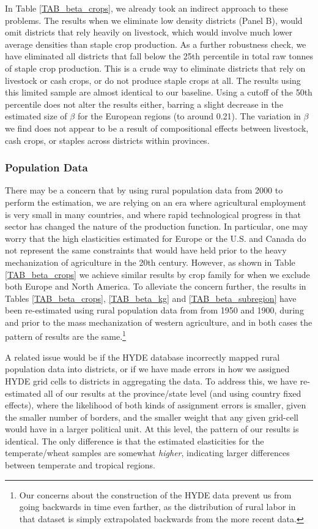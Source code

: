 \documentclass[11pt]{article}
\begin{document}
In Table \ref{TAB_beta_crops}, we already took an indirect approach to these problems. The results when we eliminate low density districts (Panel B), would omit districts that rely heavily on livestock, which would involve much lower average densities than staple crop production. As a further robustness check, we have eliminated all districts that fall below the 25th percentile in total raw tonnes of staple crop production. This is a crude way to eliminate districts that rely on livestock or cash crops, or do not produce staple crops at all. The results using this limited sample are almost identical to our baseline. Using a cutoff of the 50th percentile does not alter the results either, barring a slight decrease in the estimated size of $\beta$ for the European regions (to around 0.21). The variation in $\beta$ we find does not appear to be a result of compositional effects between livestock, cash crops, or staples across districts within provinces.

\subsubsection{Population Data} 
There may be a concern that by using rural population data from 2000 to perform the estimation, we are relying on an era where agricultural employment is very small in many countries, and where rapid technological progress in that sector has changed the nature of the production function. In particular, one may worry that the high elasticities estimated for Europe or the U.S. and Canada do not represent the same constraints that would have held prior to the heavy mechanization of agriculture in the 20th century. However, as shown in Table \ref{TAB_beta_crops} we achieve similar results by crop family for when we exclude both Europe and North America. To alleviate the concern further, the results in Tables \ref{TAB_beta_crops}, \ref{TAB_beta_kg} and \ref{TAB_beta_subregion} have been re-estimated using rural population data from \citet{hyde31} from 1950 and 1900, during and prior to the mass mechanization of western agriculture, and in both cases the pattern of results are the same.\footnote{Our concerns about the construction of the HYDE data prevent us from going backwards in time even farther, as the distribution of rural labor in that dataset is simply extrapolated backwards from the more recent data.}

A related issue would be if the HYDE database incorrectly mapped rural population data into districts, or if we have made errors in how we assigned HYDE grid cells to districts in aggregating the data. To address this, we have re-estimated all of our results at the province/state level (and using country fixed effects), where the likelihood of both kinds of assignment errors is smaller, given the smaller number of borders, and the smaller weight that any given grid-cell would have in a larger political unit. At this level, the pattern of our results is identical. The only difference is that the estimated elasticities for the temperate/wheat samples are somewhat \textit{higher}, indicating larger differences between temperate and tropical regions.
\end{document}
